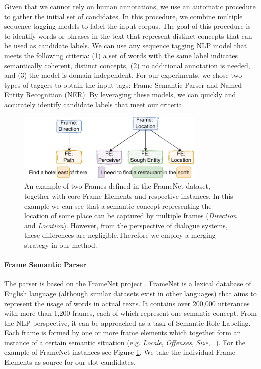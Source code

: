 Given that we cannot rely on human annotations, we use an automatic procedure to gather the initial set of candidates.
In this procedure, we combine multiple sequence tagging models to label the input corpus.
The goal of this procedure is to identify words or phrases in the text that represent distinct concepts that can be used as candidate labels.
We can use any sequence tagging NLP model that meets the following criteria: (1) a set of words with the same label indicates semantically coherent, distinct concepts, (2) no additional annotation is needed, and (3) the model is domain-independent.
For our experiments, we chose two types of taggers to obtain the input tags: Frame Semantic Parser and Named Entity Recognition (NER).
By leveraging these models, we can quickly and accurately identify candidate labels that meet our criteria.
\begin{figure}[h!]
\centering
    \includegraphics[width=0.8\textwidth]{images/framenet.pdf}
    \caption{An example of two Frames defined in the FrameNet dataset, together with core Frame Elements and respective instances. In this example we can see that a semantic concept representing the location of some place can be captured by multiple frames (\emph{Direction} and \emph{Location}). However, from the perspective of dialogue systems, these differences are negligible.Therefore we employ a merging strategy in our method.}
    \label{fig:framenet}
\end{figure}

\paragraph{Frame Semantic Parser} The parser is based on the FrameNet project \cite{baker1998berkeley}.
FrameNet is a lexical database of English language (although similar datasets exist in other languages) that aims to represent the usage of words in actual texts.
It contains over 200,000 utterances with more than 1,200 frames, each of which represent one semantic concept.
From the NLP perspective, it can be approached as a task of Semantic Role Labeling.
Each frame is formed by one or more frame elements which together form an instance of a certain semantic situation (e.g. \emph{Locale}, \emph{Offenses}, \emph{Size},...).
For the example of FrameNet instances see Figure \ref{fig:framenet}.
We take the individual Frame Elements as source for our slot candidates.
